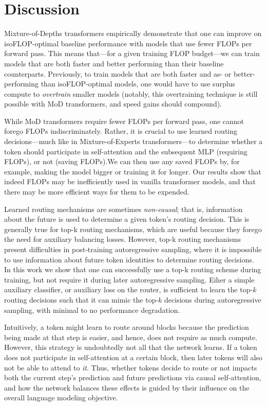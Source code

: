 \documentclass[11pt, a4paper, onecolumn, logo, copyright]{googledeepmind}
\begin{document}
\section{Discussion}
Mixture-of-Depths transformers empirically demonstrate that one can improve on isoFLOP-optimal baseline performance with models that use fewer FLOPs per forward pass. This means that---for a given training FLOP budget---we can train models that are both faster and better performing than their baseline counterparts. Previously, to train models that are both faster and as- or better-performing than isoFLOP-optimal models, one would have to use surplus compute to \emph{overtrain} smaller models (notably, this overtraining technique is still possible with MoD transformers, and speed gains should compound). 

While MoD transformers require fewer FLOPs per forward pass, one cannot forego FLOPs indiscriminately. Rather, it is crucial to use learned routing decisions---much like in Mixture-of-Experts transformers---to determine whether a token should participate in self-attention and the subsequent MLP (requiring FLOPs), or not (saving FLOPs).We can then use any saved FLOPs by, for example, making the model bigger or training it for longer. Our results show that indeed FLOPs may be inefficiently used in vanilla transformer models, and that there may be more efficient ways for them to be expended.

Learned routing mechanisms are sometimes \textit{non-causal}; that is, information about the future is used to determine a given token's routing decision. This is generally true for top-k routing mechanisms, which are useful because they forego the need for auxiliary balancing losses. However, top-k routing mechanisms present difficulties in post-training autoregressive sampling, where it is impossible to use information about future token identities to determine routing decisions. In this work we show that one can successfully use a top-k routing scheme during training, but not require it during later autoregressive sampling. Eiher a simple auxiliary classifier, or auxiliary loss on the router, is sufficient to learn the top-$k$ routing decisions such that it can mimic the top-$k$ decisions during autoregressive sampling, with minimal to no performance degradation.

Intuitively, a token might learn to route around blocks because the prediction being made at that step is easier, and hence, does not require as much compute. However, this strategy is undoubtedly not all that the network learns. If a token does not participate in self-attention at a certain block, then later tokens will also not be able to attend to \textit{it}. Thus, whether tokens decide to route or not impacts both the current step's prediction and future predictions via causal self-attention, and how the network balances these effects is guided by their influence on the overall language modeling objective. 
\end{document}
